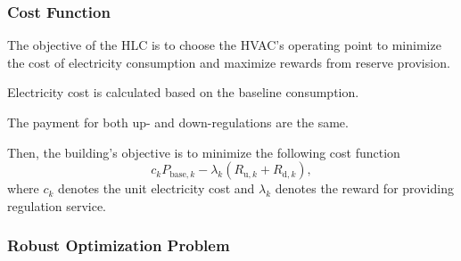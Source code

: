 
\subsubsection{Cost Function}
The objective of the HLC is to choose the HVAC's operating point to minimize the cost of electricity consumption and maximize rewards from reserve provision. 
\begin{assumption}
Electricity cost is calculated based on the baseline consumption.
\end{assumption}
\begin{assumption}
The payment for both up- and down-regulations are the same.
\end{assumption}
Then, the building's objective is to minimize the following cost function
\begin{equation}\label{eq:cost_function}
c_k P_{\text{base},k} - \lambda_k (R_{\text{u},k} + R_{\text{d},k}),
\end{equation}
where $c_k$ denotes the unit electricity cost and $\lambda_k$ denotes the reward for providing regulation service.


\subsubsection{Robust Optimization Problem}

